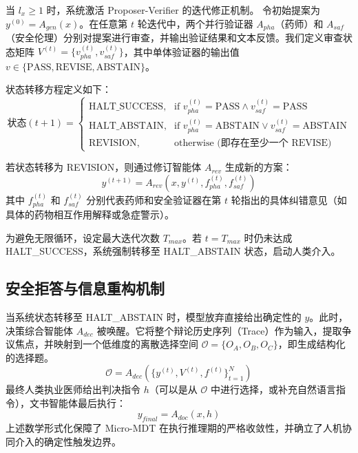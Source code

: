 \documentclass[11pt,a4paper]{ctexart}
\begin{document}
当 $l_x \geq 1$ 时，系统激活 Proposer-Verifier 的迭代修正机制。
令初始提案为 $y^{(0)} = A_{gen}(x)$。在任意第 $t$ 轮迭代中，两个并行验证器 $A_{pha}$（药师）和 $A_{saf}$（安全伦理）分别对提案进行审查，并输出验证结果和文本反馈。我们定义审查状态矩阵 $V^{(t)} = \{v_{pha}^{(t)}, v_{saf}^{(t)}\}$，其中单体验证器的输出值 $v \in \{\text{PASS}, \text{REVISE}, \text{ABSTAIN}\}$。

状态转移方程定义如下：
\begin{equation}
    \text{状态}(t+1) = 
    \begin{cases} 
      \text{HALT\_SUCCESS}, & \text{if } v_{pha}^{(t)} = \text{PASS} \land v_{saf}^{(t)} = \text{PASS} \\
      \text{HALT\_ABSTAIN}, & \text{if } v_{pha}^{(t)} = \text{ABSTAIN} \lor v_{saf}^{(t)} = \text{ABSTAIN} \\
      \text{REVISION}, & \text{otherwise (即存在至少一个 REVISE)}
    \end{cases}
\end{equation}

若状态转移为 REVISION，则通过修订智能体 $A_{rev}$ 生成新的方案：
\begin{equation}
    y^{(t+1)} = A_{rev}(x, y^{(t)}, f_{pha}^{(t)}, f_{saf}^{(t)})
\end{equation}
其中 $f_{pha}^{(t)}$ 和 $f_{saf}^{(t)}$ 分别代表药师和安全验证器在第 $t$ 轮指出的具体纠错意见（如具体的药物相互作用解释或急症警示）。

为避免无限循环，设定最大迭代次数 $T_{max}$。若 $t = T_{max}$ 时仍未达成 HALT\_SUCCESS，系统强制转移至 HALT\_ABSTAIN 状态，启动人类介入。

\subsection{安全拒答与信息重构机制}

当系统状态转移至 HALT\_ABSTAIN 时，模型放弃直接给出确定性的 $y$。此时，决策综合智能体 $A_{dec}$ 被唤醒。它将整个辩论历史序列（Trace）作为输入，提取争议焦点，并映射到一个低维度的离散选择空间 $\mathcal{O} = \{O_A, O_B, O_C\}$，即生成结构化的选择题。
\begin{equation}
    \mathcal{O} = A_{dec}(\{y^{(t)}, V^{(t)}, f^{(t)}\}_{t=1}^{N})
\end{equation}
最终人类执业医师给出判决指令 $h$（可以是从 $\mathcal{O}$ 中进行选择，或补充自然语言指令），文书智能体最后执行：
\begin{equation}
    y_{final} = A_{doc}(x, h)
\end{equation}
上述数学形式化保障了 Micro-MDT 在执行推理期的严格收敛性，并确立了人机协同介入的确定性触发边界。
\end{document}
